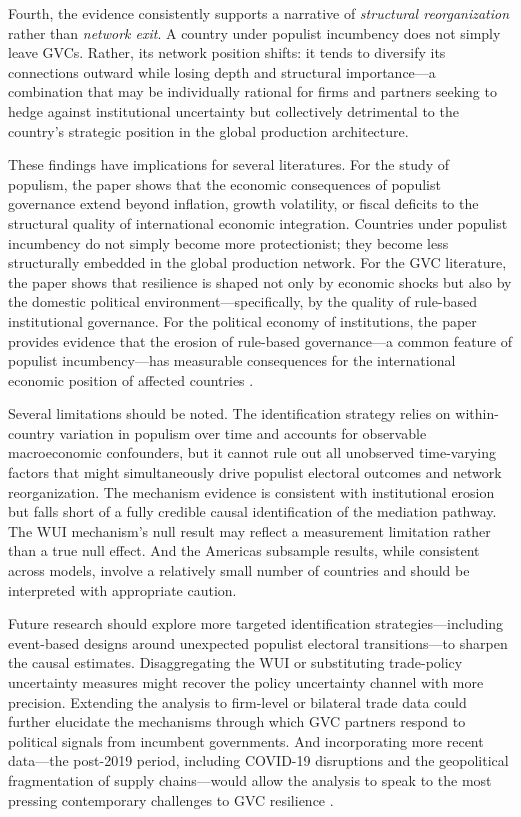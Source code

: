 \documentclass[12pt]{article}
\begin{document}
Fourth, the evidence consistently supports a narrative of \textit{structural reorganization} rather than \textit{network exit}. A country under populist incumbency does not simply leave GVCs. Rather, its network position shifts: it tends to diversify its connections outward while losing depth and structural importance---a combination that may be individually rational for firms and partners seeking to hedge against institutional uncertainty but collectively detrimental to the country's strategic position in the global production architecture.

These findings have implications for several literatures. For the study of populism, the paper shows that the economic consequences of populist governance extend beyond inflation, growth volatility, or fiscal deficits \citep{dornbusch1991, funke2020} to the structural quality of international economic integration. Countries under populist incumbency do not simply become more protectionist; they become less structurally embedded in the global production network. For the GVC literature, the paper shows that resilience is shaped not only by economic shocks \citep{miroudot2020, boehm2019, antras2020} but also by the domestic political environment---specifically, by the quality of rule-based institutional governance. For the political economy of institutions, the paper provides evidence that the erosion of rule-based governance---a common feature of populist incumbency---has measurable consequences for the international economic position of affected countries \citep{north1990, acemoglu2001, ruggie1982}.

Several limitations should be noted. The identification strategy relies on within-country variation in populism over time and accounts for observable macroeconomic confounders, but it cannot rule out all unobserved time-varying factors that might simultaneously drive populist electoral outcomes and network reorganization. The mechanism evidence is consistent with institutional erosion but falls short of a fully credible causal identification of the mediation pathway. The WUI mechanism's null result may reflect a measurement limitation rather than a true null effect. And the Americas subsample results, while consistent across models, involve a relatively small number of countries and should be interpreted with appropriate caution.

Future research should explore more targeted identification strategies---including event-based designs around unexpected populist electoral transitions---to sharpen the causal estimates. Disaggregating the WUI or substituting trade-policy uncertainty measures might recover the policy uncertainty channel with more precision. Extending the analysis to firm-level or bilateral trade data could further elucidate the mechanisms through which GVC partners respond to political signals from incumbent governments. And incorporating more recent data---the post-2019 period, including COVID-19 disruptions and the geopolitical fragmentation of supply chains---would allow the analysis to speak to the most pressing contemporary challenges to GVC resilience \citep{antras2020, worldbank2020, oecd2021resilience}.
\end{document}
